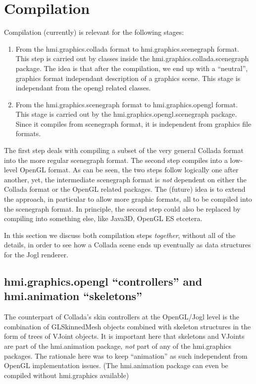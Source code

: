 
\section{Compilation}

Compilation (currently) is relevant for the following stages:
\begin{enumerate}
\item From the hmi.graphics.collada format to hmi.graphics.scenegraph format.
This step is carried out by classes inside the hmi.graphics.collada.scenegraph package.
The idea is that after the compilation, we end up with a ``neutral'', graphics format independant description of a graphics scene.
This stage is independant from the opengl related classes.
\item From the hmi.graphics.scenegraph format to hmi.graphics.opengl format.
This stage is carried out by the hmi.graphics.opengl.scenegraph package. Since it compiles
from scenegraph format, it is independent from graphics file formats.
\end{enumerate}

The first step deals with compiling a subset of the very general Collada format into
the more regular scenegraph format. The second step compiles into a low-level OpenGL format.
As can be seen, the two steps follow logically one after another, yet, the intermediate scenegraph format
is \emph{not} dependent on either the Collada format or the OpenGL related packages.
The (future) idea is to extend the approach, in particular to allow more graphic formats,
all to be compiled into the scenegraph format. In principle, the second step could also be replaced by compiling
into something else, like Java3D, OpenGL ES etcetera.

In this section we discuss both compilation steps \emph{together}, without all of the details,
in order to see how a Collada scene ends up eventually as data structures for the Jogl renderer.
















\subsection{hmi.graphics.opengl ``controllers'' and hmi.animation ``skeletons''}

The counterpart of Collada's skin controllers at the OpenGL/Jogl level is the combination
of GLSkinnedMesh objects combined with skeleton structures in the form of trees of VJoint objects.
It is important here that skeletons and VJoints are part of the hmi.animation package, \emph{not} part of any of
the hmi.graphics packages. The rationale here was to keep ``animation'' as such independent from OpenGL implementation
issues. (The hmi.animation package can even be compiled without hmi.graphics available)

